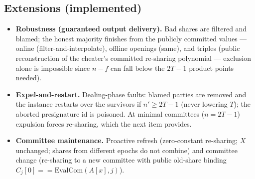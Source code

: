 \documentclass[11pt]{article}
\theoremstyle{plain}
\theoremstyle{definition}
\theoremstyle{remark}
\newcommand{\share}[1]{[#1]}
\newcommand{\EvalCom}{\mathrm{EvalCom}}
\begin{document}
\subsection{Extensions (implemented)}\label{sec:extensions}

\begin{itemize}[leftmargin=1.6em]
\item \textbf{Robustness (guaranteed output delivery).} Bad shares are filtered and blamed; the honest majority finishes from the publicly committed values --- online (filter-and-interpolate), offline openings (same), and triples (public reconstruction of the cheater's committed re-sharing polynomial --- exclusion alone is impossible since $n - f$ can fall below the $2T{-}1$ product points needed).
\item \textbf{Expel-and-restart.} Dealing-phase faults: blamed parties are removed and the instance restarts over the survivors if $n' \geq 2T{-}1$ (never lowering $T$); the aborted presignature id is poisoned. At minimal committees ($n = 2T{-}1$) expulsion forces re-sharing, which the next item provides.
\item \textbf{Committee maintenance.} Proactive refresh (zero-constant re-sharing; $X$ unchanged; shares from different epochs do not combine) and committee change (re-sharing to a new committee with public old-share binding $C_j[0] == \EvalCom(A\share{x}, j)$).

\end{itemize}
\end{document}
